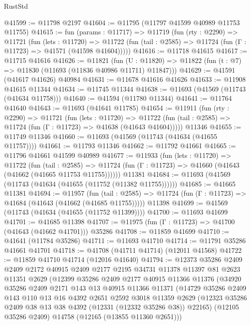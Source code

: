 \begin{lexlean}{RustStd}
\begin{coremodule}
@41599 := @11798 @2197
@41604 := @11795 (@11797 @41599 @40989 @11753 @11755)
@41615 := fun (params : @11717) =>
  @11719
    (fun (rty : @2290) =>
    @11721
      (fun (lets : @11720) =>
      @11722 (fun (tail : @2585) => @11724 (fun (Γ : @11723) => @41571 (@41598 @41604)))))
@41616 := @11718 @41615
@41617 := @11715 @41616
@41626 := @11821
    (fun (U : @11820) => @11822 (fun (t : @7) => @11830 (@11693 (@11836 @40986 @11711) @11847)))
@41629 := @41591 (@41617 @41626) @40984
@41631 := @11678 @41616 @41626
@41633 := @11908 @41615 @11344
@41634 := @11745 @11344
@41638 := @11693 (@41569 (@11743 (@41634 @11758)))
@41640 := @41594 (@11780 @11344)
@41641 := @11764 @41640
@41643 := @11693 (@41641 @11785)
@41654 := @11911
    (fun (rty : @2290) =>
    @11721
      (fun (lets : @11720) =>
      @11722 (fun (tail : @2585) => @11724 (fun (Γ : @11723) => @41638 (@41643 @41604)))))
    @11346
@41655 := @11749 @11346
@41660 := @11693 (@41569 (@11743 (@41634 (@41655 @11757))))
@41661 := @11793 @11346
@41662 := @11792 @41661
@41665 := @11796 @41661 @41599 @40989
@41677 := @11933
    (fun (lets : @11720) =>
    @11722
      (fun (tail : @2585) =>
      @11724 (fun (Γ : @11723) => @41660 (@41643 (@41662 (@41665 @11753 @11755))))))
    @11381
@41684 := @11693 (@41569 (@11743 (@41634 (@41655 (@11752 (@11382 @11755))))))
@41685 := @41665 @11381
@41694 := @11957
    (fun (tail : @2585) => @11724 (fun (Γ : @11723) => @41684 (@41643 (@41662 (@41685 @11755)))))
    @11398
@41699 := @41569 (@11743 (@41634 (@41655 (@11752 @11399))))
@41700 := @11693 @41699
@41701 := @41685 @11398
@41707 := @11975 (fun (Γ : @11723) => @41700 (@41643 (@41662 @41701))) @35286
@41708 := @11859 @41699
@41710 := @41641 (@11784 @35286)
@41711 := @11693 @41710
@41714 := @11791 @35286 @41661 @41701
@41718 := @41708 (@41711 @41714) (@12011 @41568)
@41722 := @11859 @41710 @41714 (@12016 @41640)
@41794 := @12373
    @35286
    @2409
    @2409
    @2172
    @40915
    @2409
    @2177
    @2195
    @34731
    @11378
    @11397
    @81
    @2623
    @11351
    @2629
    (@12399
      @35286
      @2409
      @2177
      @40915
      @11366
      @11376
      (@34920
        @35286
        @2409
        @2171
        @143
        @13
        @40915
        @11366
        @11371
        (@14729
          @35286
          @2409
          @143
          @110
          @13
          @16
          @4392
          @2651
          @2592
          @3018
          @11359
          @2629
          (@12323 @35286 @2409 @38 @13 @38 @4392 (@12331 (@12332 @35286 @38)) @22165)
          (@12105 @35286 @2409)
          @14758
          (@12165 (@13855 @11360 @2651)))

\end{coremodule}
\end{lexlean}
